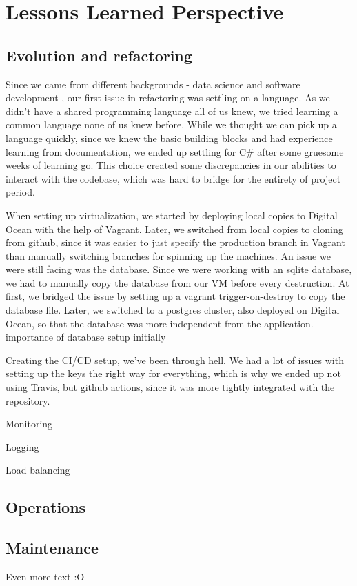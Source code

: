 \documentclass[report/main.tex]{subfiles}
\begin{document}
    \section{Lessons Learned Perspective}
    \label{Sec:lessons_learned_persective}
    \subsection{Evolution and refactoring}
    Since we came from different backgrounds - data science and software development-, our first issue in refactoring was settling on a language. As we didn't have a shared programming language all of us knew, we tried learning a common language none of us knew before. While we thought we can pick up a language quickly, since we knew the basic building blocks and had experience learning from documentation, we ended up settling for C\# after some gruesome weeks of learning go. This choice created some discrepancies in our abilities to interact with the codebase, which was hard to bridge for the entirety of project period.
    
    When setting up virtualization, we started by deploying local copies to Digital Ocean with the help of Vagrant. Later, we switched from local copies to cloning from github, since it was easier to just specify the production branch in Vagrant than manually switching branches for spinning up the machines. An issue we were still facing was the database. Since we were working with an sqlite database, we had to manually copy the database from our VM before every destruction. At first, we bridged the issue by setting up a vagrant trigger-on-destroy to copy the database file. Later, we switched to a postgres cluster, also deployed on Digital Ocean, so that the database was more independent from the application.
    importance of database setup initially
    
    Creating the CI/CD setup, we've been through hell. We had a lot of issues with setting up the keys the right way for everything, which is why we ended up not using Travis, but github actions, since it was more tightly integrated with the repository.
    
    Monitoring
    
    Logging
    
    Load balancing
    \subsection{Operations}
    
    \subsection{Maintenance}
        Even more text :O
\end{document}
